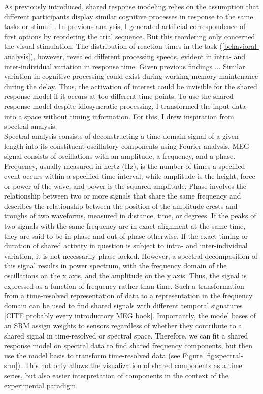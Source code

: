 As previously introduced, shared response modeling relies on the assumption that different participants display similar cognitive processes in response to the same tasks or stimuli \citep{NIPS2015_b3967a0e}.
In previous analysis, I generated artificial correspondence of first options by reordering the trial sequence.
But this reordering only concerned the visual stimulation.
The distribution of reaction times in the task (\ref{behavioral-analysis}), however, revealed different processing speeds, evident in intra- and inter-individual variation in response time.
Given previous findings ... Similar variation in cognitive processing could exist during working memory maintenance during the delay.
Thus, the activation of interest could be invisible for the shared response model if it occurs at too different time points.
To use the shared response model despite idiosyncratic processing, I transformed the input data into a space without timing information.
For this, I drew inspiration from spectral analysis.\\
Spectral analysis consists of deconstructing a time domain signal of a given length into its constituent oscillatory components using Fourier analysis.
MEG signal consists of oscillations with an amplitude, a frequency, and a phase.
Frequency, usually measured in hertz (Hz), is the number of times a specified event occurs within a specified time interval, while amplitude is the height, force or power of the wave, and power is the squared amplitude.
Phase involves the relationship between two or more signals that share the same frequency and describes the relationship between the position of the amplitude crests and troughs of two waveforms, measured in distance, time, or degrees.
If the peaks of two signals with the same frequency are in exact alignment at the same time, they are said to be in phase and out of phase otherwise.
If the exact timing or duration of shared activity in question is subject to intra- and inter-individual variation, it is not necessarily phase-locked.
However, a spectral decomposition of this signal results in power spectrum, with the frequency domain of the oscillations on the x axis, and the amplitude on the y axis.
Thus, the signal is expressed as a function of frequency rather than time.
Such a transformation from a time-resolved representation of data to a representation in the frequency domain can be used to find shared signals with different temporal signatures [CITE probably every introductory MEG book].
Importantly, the model bases of an \gls{SRM} assign weights to sensors regardless of whether they contribute to a shared signal in time-resolved or spectral space.
Therefore, we can fit a shared response model on spectral data to find shared frequency components, but then use the model basis to transform time-resolved data (see Figure \ref{fig:spectral-srm}).
This not only allows the visualization of shared components as a time series, but also easier interpretation of components in the context of the experimental paradigm.

